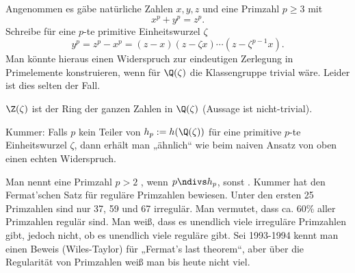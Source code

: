 \begin{ex} \label{8.31}
	Angenommen es gäbe natürliche Zahlen $x, y, z$ und eine Primzahl $p \ge 3$ mit
	\[
		x^p + y^p = z^p.
	\]
	Schreibe für eine $p$-te primitive Einheitswurzel $\zeta$
	\[
		y^p = z^p - x^p = (z-x)(z-\zeta x) \dotsb (z - \zeta^{p-1}x).
	\]
	Man könnte hieraus einen Widerspruch zur eindeutigen Zerlegung in Primelemente konstruieren, wenn für $\Q(\zeta)$ die Klassengruppe trivial wäre.
	Leider ist dies selten der Fall.

	$\Z(\zeta)$ ist der Ring der ganzen Zahlen in $\Q(\zeta)$ (Aussage ist nicht-trivial).
\end{ex}

\begin{nt}
	Kummer: Falls $p$ kein Teiler von $h_p := h(\Q(\zeta))$ für eine primitive $p$-te Einheitswurzel $\zeta$, dann erhält man „ähnlich“ wie beim naiven Ansatz von oben einen echten Widerspruch.

	Man nennt eine Primzahl $p > 2$ , wenn $p \ndivs h_p$, sonst .
	Kummer hat den Fermat'schen Satz für reguläre Primzahlen bewiesen.
	Unter den ersten 25 Primzahlen sind nur 37, 59 und 67 irregulär.
	Man vermutet, dass ca. 60\% aller Primzahlen regulär sind.
	Man weiß, dass es unendlich viele irreguläre Primzahlen gibt, jedoch nicht, ob es unendlich viele reguläre gibt.
	Sei 1993-1994 kennt man einen Beweis (Wiles-Taylor) für „Fermat's last theorem“, aber über die Regularität von Primzahlen weiß man bis heute nicht viel.
\end{nt}




